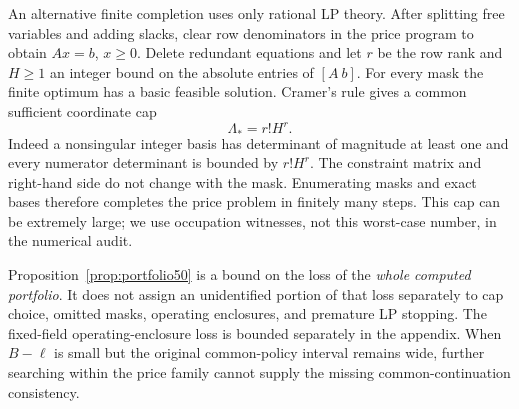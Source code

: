 An alternative finite completion uses only rational LP theory. After splitting free variables and adding slacks, clear row denominators in the price program to obtain $Ax=b$, $x\ge0$. Delete redundant equations and let $r$ be the row rank and $H\ge1$ an integer bound on the absolute entries of $[A\ b]$. For every mask the finite optimum has a basic feasible solution. Cramer's rule gives a common sufficient coordinate cap
\[
 \Lambda_* = r!H^r.
\]
Indeed a nonsingular integer basis has determinant of magnitude at least one and every numerator determinant is bounded by $r!H^r$. The constraint matrix and right-hand side do not change with the mask. Enumerating masks and exact bases therefore completes the price problem in finitely many steps. This cap can be extremely large; we use occupation witnesses, not this worst-case number, in the numerical audit.

Proposition~\ref{prop:portfolio50} is a bound on the loss of the \emph{whole computed portfolio}. It does not assign an unidentified portion of that loss separately to cap choice, omitted masks, operating enclosures, and premature LP stopping. The fixed-field operating-enclosure loss is bounded separately in the appendix. When $B-\ell$ is small but the original common-policy interval remains wide, further searching within the price family cannot supply the missing common-continuation consistency.
